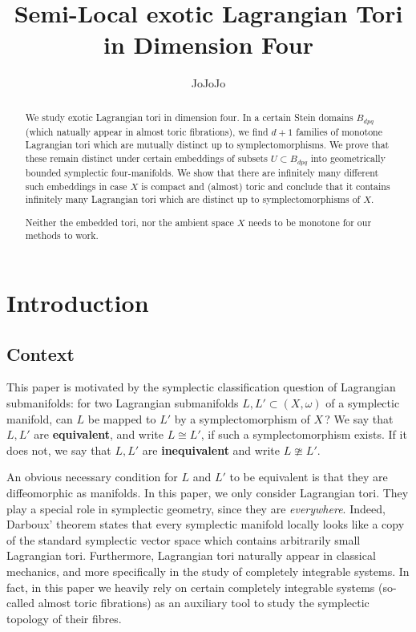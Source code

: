 \documentclass[12pt,a4paper,abstract=true,draft]{scrartcl}
\begin{document}
\title{Semi-Local exotic Lagrangian Tori in Dimension Four}
\author{JoJoJo}

\maketitle

\begin{abstract}
    We study exotic Lagrangian tori in dimension four.
In a certain Stein domains $B_{dpq}$ (which natually appear in almost toric fibrations), we find $d+1$ families of monotone Lagrangian tori which are mutually distinct up to symplectomorphisms.
We prove that these remain distinct under certain embeddings of subsets $U \subset B_{dpq}$ into geometrically bounded symplectic four-manifolds.
We show that there are infinitely many different such embeddings in case $X$ is compact and (almost) toric and conclude that it contains infinitely many Lagrangian tori which are distinct up to symplectomorphisms of $X$.

    Neither the embedded tori, nor the ambient space $X$ needs to be monotone for our methods to work. 
\end{abstract}

\section{Introduction}

\subsection{Context}
\label{sec:intro_context}

This paper is motivated by the symplectic classification question of Lagrangian submanifolds: for two Lagrangian submanifolds $L,L' \subset (X,\omega)$ of a symplectic manifold, can $L$ be mapped to $L'$ by a symplectomorphism of $X\,$? We say that $L,L'$ are \textbf{equivalent}, and write $L \cong L'$, if such a symplectomorphism exists.
If it does not, we say that $L,L'$ are \textbf{inequivalent} and write $L \ncong L'$. 

An obvious necessary condition for $L$ and $L'$ to be equivalent is that they are diffeomorphic as manifolds.
In this paper, we only consider Lagrangian tori.
They play a special role in symplectic geometry, since they are \emph{everywhere}.
Indeed, Darboux' theorem states that every symplectic manifold locally looks like a copy of the standard symplectic vector space which contains arbitrarily small Lagrangian tori.
Furthermore, Lagrangian tori naturally appear in classical mechanics, and more specifically in the study of completely integrable systems.
In fact, in this paper we heavily rely on certain completely integrable systems (so-called almost toric fibrations) as an auxiliary tool to study the symplectic topology of their fibres.
\end{document}

